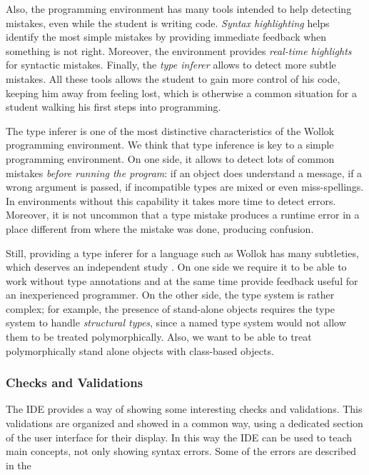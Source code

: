 Also, the programming environment has many tools intended to help detecting mistakes, even while the student is writing code.
\emph{Syntax highlighting} helps identify the most simple mistakes by providing immediate feedback when something is not right. 
Moreover, the environment provides \emph{real-time highlights} for syntactic mistakes.
Finally, the \emph{type inferer} allows to detect more subtle mistakes.
All these tools allows the student to gain more control of his code, keeping him away from feeling lost, 
which is otherwise a common situation for a student walking his first steps into programming.


\medskip
The type inferer is one of the most distinctive characteristics of the Wollok programming environment.
We think that type inference is key to a simple programming environment.
On one side, it allows to detect lots of common mistakes \emph{before running the program}:
if an object does understand a message, if a wrong argument is passed, if incompatible types are mixed or even miss-spellings.
In environments without this capability it takes more time to detect errors.
Moreover, it is not uncommon that a type mistake produces a runtime error in a place different from where the mistake was done, producing confusion.

Still, providing a type inferer for a language such as Wollok has many subtleties, which deserves an independent study \cite{type inferer}.
On one side we require it to be able to work without type annotations and at the same time provide feedback useful for an inexperienced programmer.
On the other side, the type system is rather complex;
for example, the presence of stand-alone objects requires the type system to handle \emph{structural types}, since a named type system would not allow them to be treated polymorphically.
Also, we want to be able to treat polymorphically stand alone objects with class-based objects.

\subsubsection{Checks and Validations}

The IDE provides a way of showing some interesting checks and validations. This validations are organized and showed in a common way, using a dedicated section of the user interface for their display. In this way the IDE can be used to teach main concepts, not only showing syntax errors. Some of the errors are described in the 
